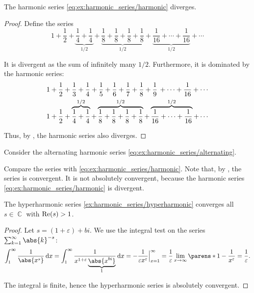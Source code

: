 \begin{proposition}\label{thm:harmonic_series_diverges}
  The harmonic series \eqref{eq:ex:harmonic_series/harmonic} diverges.
\end{proposition}
\begin{proof}
  Define the series
  \begin{equation*}
    1 + \frac 1 2 + \underbrace{\frac 1 4 + \frac 1 4}_{1 / 2} + \underbrace{\frac 1 8 + \frac 1 8 + \frac 1 8 + \frac 1 8}_{1 / 2} + \underbrace{\frac 1 {16} + \cdots + \frac 1 {16}}_{1 / 2} + \cdots
  \end{equation*}

  It is divergent as the sum of infinitely many \( 1 / 2 \). Furthermore, it is dominated by the harmonic series:
  \begin{align*}
    &1 + \frac 1 2 + \frac 1 3 + \frac 1 4 + \frac 1 5 + \frac 1 6 + \frac 1 7 + \frac 1 8 + \frac 1 9 \thinspace + \cdots + \frac 1 {16} + \cdots
    \\
    &1 + \frac 1 2 + \overbrace{ \frac 1 4 + \frac 1 4 }^{1 / 2} + \overbrace{ \frac 1 8 + \frac 1 8 + \frac 1 8 + \frac 1 8 }^{1 / 2} + \overbrace{ \frac 1 {16} + \cdots + \frac 1 {16} }^{1 / 2} + \cdots
  \end{align*}

  Thus, by , the harmonic series also diverges.
\end{proof}

\begin{proposition}\label{thm:alternating_harmonic_series_convergence}
  Consider the alternating harmonic series \eqref{eq:ex:harmonic_series/alternating}.

  Compare the series with \eqref{eq:ex:harmonic_series/harmonic}. Note that, by , the series is convergent. It is not absolutely convergent, because the harmonic series \eqref{eq:ex:harmonic_series/harmonic} is divergent.
\end{proposition}

\begin{proposition}\label{thm:hyperharmonic_series_convergence}
  The hyperharmonic series \eqref{ex:harmonic_series/hyperharmonic} converges all \( s \in \BbbC \) with \( \operatorname{Re}(s) > 1 \).
\end{proposition}
\begin{proof}
  Let \( s = (1 + \varepsilon) + bi \). We use the integral test on the series \( \sum_{k=1}^\infty \abs{k}^{-s} \):
  \begin{equation*}
    \int_1^\infty \frac 1 {\abs{x^s}} \dl x
    =
    \int_1^\infty \frac 1 {x^{1 + \varepsilon} \underbrace{\abs{x^{bi}}}_{1}} \dl x
    =
    -\frac 1 {\varepsilon x^\varepsilon}\Big\restr_{x=1}^\infty
    =
    \frac 1 \varepsilon \lim_{x \to \infty} \parens*{ 1 - \frac 1 {x^\varepsilon} }
    =
    \frac 1 \varepsilon.
  \end{equation*}

  The integral is finite, hence the hyperharmonic series is absolutely convergent.
\end{proof}
